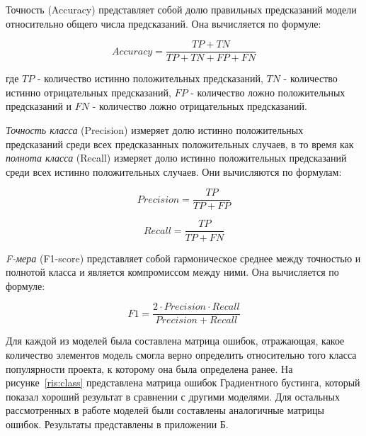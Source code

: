 Точность (Accuracy) представляет собой долю правильных предсказаний модели относительно общего числа предсказаний. Она вычисляется по формуле:

\[ Accuracy = \frac{TP + TN}{TP + TN + FP + FN} \]
\vspace{1.5em}

где \( TP \) - количество истинно положительных предсказаний, \( TN \) - количество истинно отрицательных предсказаний, \( FP \) - количество ложно положительных предсказаний и \( FN \) - количество ложно отрицательных предсказаний.

\textit{Точность класса} (Precision) измеряет долю истинно положительных предсказаний среди всех предсказанных положительных случаев, в то время как \textit{полнота класса} (Recall) измеряет долю истинно положительных предсказаний среди всех истинно положительных случаев. Они вычисляются по формулам:

\[ Precision = \frac{TP}{TP + FP} \]

\[ Recall = \frac{TP}{TP + FN} \]
\vspace{1.5em}

\textit{F-мера} (F1-score) представляет собой гармоническое среднее между точностью и полнотой класса и является компромиссом между ними. Она вычисляется по формуле:

\[ F1 = \frac{2 \cdot Precision \cdot Recall}{Precision + Recall} \]
\vspace{1.5em}

Для каждой из моделей была составлена матрица ошибок, отражающая, какое количество элементов модель смогла верно определить относительно того класса популярности проекта, к которому она была определена ранее. На рисунке~\ref{ris:class} представлена матрица ошибок Градиентного бустинга, который показал хороший результат в сравнении с другими моделями. Для остальных рассмотренных в работе моделей были составлены аналогичные матрицы ошибок. Результаты представлены в приложении Б. 

